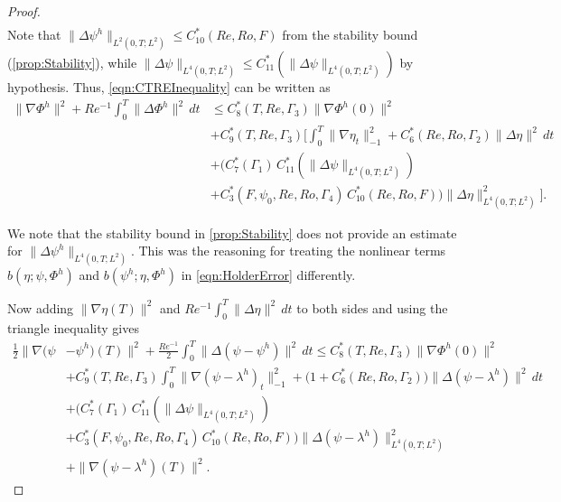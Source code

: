 \begin{proof}
\begin{align}
    \label{eqn:HolderPsi}
  \end{align}
  Note that $\|\Delta \psi^h\|_{L^2(0,T;L^2)}\le C^*_{10}(Re,Ro,F)$ from the
  stability bound (\autoref{prop:Stability}), while $\|\Delta
  \psi\|_{L^4(0,T;L^2)}\le C^*_{11}(\|\Delta \psi \|_{L^4(0,T;L^2)})$ by hypothesis. Thus, \eqref{eqn:CTREInequality}
  can be written as
  \begin{align*}
    \|\nabla \Phi^h\|^2 + Re^{-1} \int_0^T\! \|\Delta \Phi^h\|^2\, dt
      & \le C^*_8(T,Re,\Gamma_3) \|\nabla \Phi^h(0)\|^2 \\
    & + C^*_9(T,Re,\Gamma_3)\biggl[ \int_0^T\! \|\nabla \eta_t\|_{-1}^2
      + C^*_6(Re,Ro,\Gamma_2) \|\Delta \eta\|^2\, dt \\
    & +\bigl(C^*_7(\Gamma_1)\,C^*_{11}(\|\Delta \psi \|_{L^4(0,T;L^2)}) \\
    & + C^*_3(F,\psi_0,Re,Ro,\Gamma_4)\,C^*_{10}(Re,Ro,F)\bigr)
      \|\Delta \eta\|^2_{L^4(0,T;L^2)}\biggr].
  \end{align*}
  \begin{remark}
    We note that the stability bound in \autoref{prop:Stability} does not
    provide an estimate for $\|\Delta \psi^h\|_{L^4(0,T;L^2)}$. This was the
    reasoning for treating the nonlinear terms $b(\eta;\psi,\Phi^h)$ and
    $b(\psi^h;\eta,\Phi^h)$ in \eqref{eqn:HolderError} differently.
  \end{remark}
  Now adding $\|\nabla \eta(T)\|^2$ and $Re^{-1} \int_0^T\! \|\Delta \eta\|^2\,
  dt$ to both sides and using the triangle inequality gives
  \begin{equation}
    \begin{split}
      \frac{1}{2} \|\nabla \biggl( \psi &- \psi^h\biggr)(T) \|^2
      + \frac{Re^{-1}}{2} \int_0^T\! \|\Delta \left(\psi - \psi^h\right)\|^2\, dt
        \le C^*_8(T,Re,\Gamma_3) \|\nabla \Phi^h(0)\|^2 \\
      & + C^*_9(T,Re,\Gamma_3) \int_0^T\! \|\nabla \left( \psi - \lambda^h\right)_t\|_{-1}^2
        + \bigl(1 + C^*_6(Re,Ro,\Gamma_2)\bigr)
        \|\Delta \left(\psi - \lambda^h\right)\|^2\, dt \\
      & + \bigl(C^*_7(\Gamma_1)\, C^*_{11}(\|\Delta \psi \|_{L^4(0,T;L^2)}) \\
      & + C^*_3(F,\psi_0,Re,Ro,\Gamma_4)\,C^*_{10}(Re,Ro,F)\bigr)
        \|\Delta \left(\psi - \lambda^h\right)\|^2_{L^4(0,T;L^2)} \\
      & + \|\nabla \left(\psi - \lambda^h\right)(T)\|^2.
    \end{split}
    \label{eqn:TriangleIneq1}

\end{equation}
\end{proof}

